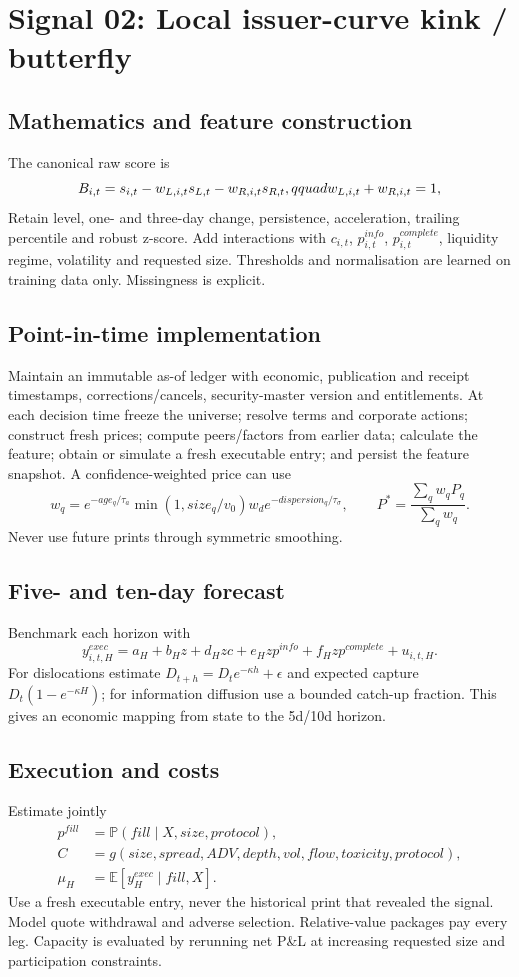 \documentclass[10pt]{article}
\newcommand{\E}{\mathbb{E}}\newcommand{\Pp}{\mathbb{P}}
\begin{document}
\section{Signal 02: Local issuer-curve kink / butterfly}
\subsection{Mathematics and feature construction}
The canonical raw score is
\begin{equation}B_{i,t}=s_{i,t}-w_{L,i,t}s_{L,t}-w_{R,i,t}s_{R,t},\\qquad w_{L,i,t}+w_{R,i,t}=1,\end{equation}
Retain level, one- and three-day change, persistence, acceleration, trailing percentile and robust z-score. Add interactions with $c_{i,t}$, $p^{info}_{i,t}$, $p^{complete}_{i,t}$, liquidity regime, volatility and requested size. Thresholds and normalisation are learned on training data only. Missingness is explicit.

\subsection{Point-in-time implementation}
Maintain an immutable as-of ledger with economic, publication and receipt timestamps, corrections/cancels, security-master version and entitlements. At each decision time freeze the universe; resolve terms and corporate actions; construct fresh prices; compute peers/factors from earlier data; calculate the feature; obtain or simulate a fresh executable entry; and persist the feature snapshot. A confidence-weighted price can use
\[w_q=e^{-age_q/\tau_a}\min(1,size_q/v_0)w_d e^{-dispersion_q/\tau_\sigma},\qquad P^*=\frac{\sum_qw_qP_q}{\sum_qw_q}.\]
Never use future prints through symmetric smoothing.

\subsection{Five- and ten-day forecast}
Benchmark each horizon with
\[y^{exec}_{i,t,H}=a_H+b_Hz+d_Hzc+e_Hzp^{info}+f_Hzp^{complete}+u_{i,t,H}.\]
For dislocations estimate $D_{t+h}=D_te^{-\kappa h}+\epsilon$ and expected capture $D_t(1-e^{-\kappa H})$; for information diffusion use a bounded catch-up fraction. This gives an economic mapping from state to the 5d/10d horizon.

\subsection{Execution and costs}
Estimate jointly
\begin{align}
p^{fill}&=\Pp(fill\mid X,size,protocol),\\
C&=g(size,spread,ADV,depth,vol,flow,toxicity,protocol),\\
\mu_H&=\E[y^{exec}_H\mid fill,X].
\end{align}
Use a fresh executable entry, never the historical print that revealed the signal. Model quote withdrawal and adverse selection. Relative-value packages pay every leg. Capacity is evaluated by rerunning net P\&L at increasing requested size and participation constraints.
\end{document}
